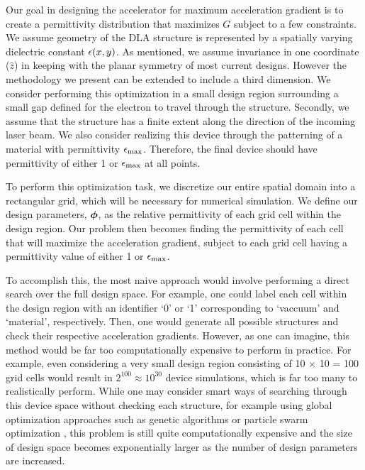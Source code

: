 
Our goal in designing the accelerator for maximum acceleration gradient is to create a permittivity distribution that maximizes $G$ subject to a few constraints.
We assume geometry of the DLA structure is represented by a spatially varying dielectric constant $\epsilon(x,y)$.
As mentioned, we assume invariance in one coordinate ($\hat{z}$) in keeping with the planar symmetry of most current designs.
However the methodology we present can be extended to include a third dimension.
We consider performing this optimization in a small design region surrounding a small gap defined for the electron to travel through the structure.
Secondly, we assume that the structure has a finite extent along the direction of the incoming laser beam.
We also consider realizing this device through the patterning of a material with permittivity $\epsilon_\textrm{max}$.
Therefore, the final device should have permittivity of either 1 or $\epsilon_\textrm{max}$ at all points.

To perform this optimization task, we discretize our entire spatial domain into a rectangular grid, which will be necessary for numerical simulation.
We define our design parameters, $\bm{\phi}$, as the relative permittivity of each grid cell within the design region.
Our problem then becomes finding the permittivity of each cell that will maximize the acceleration gradient, subject to each grid cell having a permittivity value of either 1 or $\epsilon_\textrm{max}$.

To accomplish this, the most naive approach would involve performing a direct search over the full design space.
For example, one could label each cell within the design region with an identifier `0' or `1' corresponding to `vaccuum' and `material', respectively.
Then, one would generate all possible structures and check their respective acceleration gradients.
However, as one can imagine, this method would be far too computationally expensive to perform in practice.
For example, even considering a very small design region consisting of 10 $\times$ 10 = 100 grid cells would result in $2^{100} \approx 10^{30}$ device simulations, which is far too many to realistically perform.
While one may consider smart ways of searching through this device space without checking each structure, for example using global optimization approaches such as genetic algorithms \cite{whitley_genetic_1994} or particle swarm optimization \cite{noauthor_particle_nodate}, this problem is still quite computationally expensive and the size of design space becomes exponentially larger as the number of design parameters are increased.

